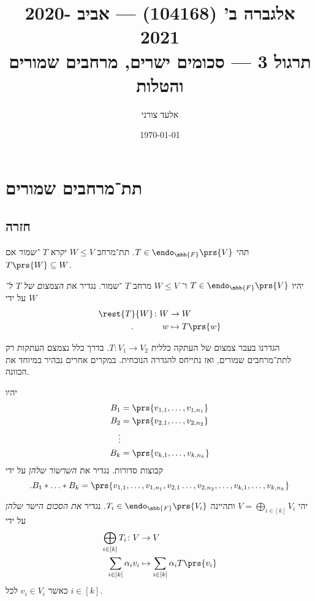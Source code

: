 \documentclass[a4paper,10pt,oneside,openany]{article}
\title{
אלגברה ב' (104168) \textenglish{---} אביב 2020-2021
\\
תרגול 3 \textenglish{---} סכומים ישרים, מרחבים שמורים והטלות
}
\author{אלעד צורני}
\date{\today}
\begin{document}
\maketitle

\section{תת־מרחבים שמורים}

\subsection{חזרה}

\begin{definition}
תהי
$T \in \endo_{\mbb{F}}\prs{V}$.
תת־מרחב
$W \leq V$
יקרא
\emph{$T$%
־שמור}
אם
$T\prs{W} \subseteq W$.
\end{definition}

\begin{definition}
יהיו
$T \in \endo_{\mbb{F}}\prs{V}$
ו־%
$W \leq V$
מרחב
$T$%
־שמור.
נגדיר את
\emph{הצמצום של
$T$
ל־%
$W$}
על ידי
\begin{align*}
\rest{T}{W} \colon W &\to W \\
\text{.} \hphantom{lalalala} w &\mapsto T\prs{w}
\end{align*}
\end{definition}

\begin{remark}
הגדרנו בעבר צמצום של העתקה כללית
$T \colon V_1 \to V_2$.
בדרך כלל נצמצם העתקות רק לתת־מרחבים שמורים, ואז נתייחס להגדרה הנוכחית.
במקרים אחרים נבהיר במיוחד את הכוונה.
\end{remark}

\begin{definition}
יהיו
\begin{align*}
B_1 &= \prs{v_{1,1}, \ldots, v_{1,n_1}} \\
B_2 &= \prs{v_{2,1}, \ldots, v_{2,n_2}} \\
\vdots \\
B_k &= \prs{v_{k,1}, \ldots, v_{k,n_k}}
\end{align*}
קבוצות סדורות.
נגדיר את
\emph{השרשור שלהן}
על ידי
\[\text{.} B_1 * \ldots * B_k = \prs{v_{1,1}, \ldots, v_{1,n_1}, v_{2,1} \ldots, v_{2,n_2}, \ldots, v_{k,1}, \ldots, v_{k, n_k}}\]
\end{definition}

\begin{definition}
יהי
$V = \bigoplus_{i \in [k]} V_i$
ותהיינה
$T_i \in \endo_{\mbb{F}}\prs{V_i}$.
נגדיר
\emph{את הסכום הישר שלהן}
על ידי
\begin{align*}
\bigoplus_{i \in [k]} T_i \colon V &\to V \\
\sum_{i \in [k]} \alpha_i v_i &\mapsto \sum_{i \in [k]} \alpha_i T\prs{v_i}
\end{align*}
כאשר
$v_i \in V_i$
לכל
$i \in [k]$.
\end{definition}
\end{document}

